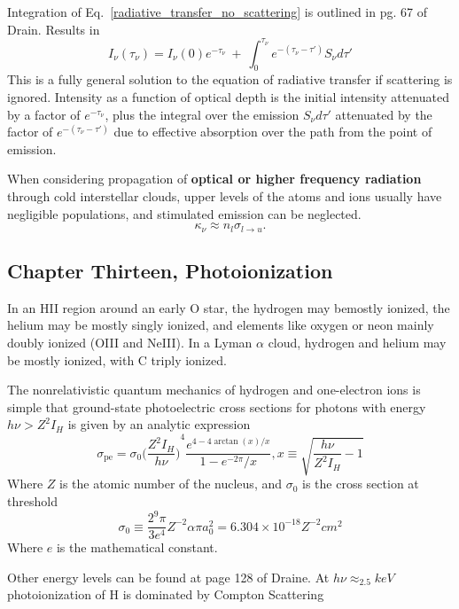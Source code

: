 Integration of Eq.~\ref{radiative_transfer_no_scattering} is outlined in pg. 67 of Drain. Results in 
\begin{equation}
  I_{\nu}(\tau_{\nu})=I_{\nu}(0)e^{-\tau_{\nu}}~+~\int_{0}^{\tau_{\nu}}e^{-(\tau_{\nu}-\tau')}S_{\nu}d\tau'
\end{equation}
This is a fully general solution to the equation of radiative transfer if scattering is ignored. Intensity as a function of optical depth is the initial intensity attenuated by a factor of $ e^{-\tau_{\nu}} $, plus the integral over the emission $ S_{\nu}d\tau' $ attenuated by the factor of $ e^{-(\tau_{\nu} - \tau ')} $  due to effective absorption over the path from the point of emission.

When considering propagation of \textbf{optical or higher frequency radiation} through cold interstellar clouds, upper levels of the atoms and ions usually have negligible populations, and stimulated emission can be neglected.
\[\kappa_{\nu}\approx n_{l}\sigma_{l\to u}.\] 

\subsection{Chapter Thirteen, Photoionization}

In an HII region around an early O star, the hydrogen may bemostly ionized, the helium may be mostly singly ionized, and elements like oxygen or neon mainly doubly ionized (OIII and NeIII). In a Lyman $ \alpha $ cloud, hydrogen and helium may be mostly ionized, with C triply ionized.

The nonrelativistic quantum mechanics of hydrogen and one-electron ions is simple that ground-state photoelectric cross sections for photons with energy $ h\nu > Z^2I_{H} $ is given by an analytic expression
\begin{equation}
  \sigma_{\text{pe}} = \sigma_{0}{\big(\frac{Z^2I_{H}}{h\nu}\big)}^{4}\frac{e^{4-4\arctan(x)/x}}{1-e^{-2\pi}/x},x\equiv\sqrt{\frac{h\nu}{Z^2I_{H}}-1}
\end{equation}
Where $ Z $ is the atomic number of the nucleus, and $ \sigma_{0} $ is the cross section at threshold
\begin{equation}
  \sigma_{0}\equiv \frac{2^{9}\pi}{3e^{4}}Z^{-2}\alpha \pi a^2_{0}=6.304 \times 10^{-18}Z^{-2}cm^2
\end{equation}
Where $ e $ is the mathematical constant.

Other energy levels can be found at page 128 of Draine. At $ h\nu\approx_2.5keV $ photoionization of H is dominated by Compton Scattering

